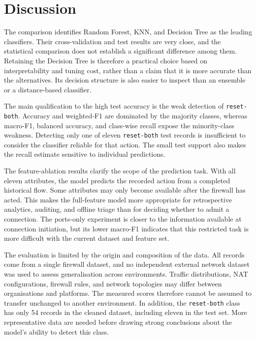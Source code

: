 \section{Discussion}\label{sec:results-discussion}

The comparison identifies Random Forest, KNN, and Decision Tree as the leading classifiers. Their cross-validation and test results are very close, and the statistical comparison does not establish a significant difference among them. Retaining the Decision Tree is therefore a practical choice based on interpretability and tuning cost, rather than a claim that it is more accurate than the alternatives. Its decision structure is also easier to inspect than an ensemble or a distance-based classifier.

The main qualification to the high test accuracy is the weak detection of \texttt{reset-both}. Accuracy and weighted-F1 are dominated by the majority classes, whereas macro-F1, balanced accuracy, and class-wise recall expose the minority-class weakness. Detecting only one of eleven \texttt{reset-both} test records is insufficient to consider the classifier reliable for that action. The small test support also makes the recall estimate sensitive to individual predictions.

The feature-ablation results clarify the scope of the prediction task. With all eleven attributes, the model predicts the recorded action from a completed historical flow. Some attributes may only become available after the firewall has acted. This makes the full-feature model more appropriate for retrospective analytics, auditing, and offline triage than for deciding whether to admit a connection. The ports-only experiment is closer to the information available at connection initiation, but its lower macro-F1 indicates that this restricted task is more difficult with the current dataset and feature set.

The evaluation is limited by the origin and composition of the data. All records come from a single firewall dataset, and no independent external network dataset was used to assess generalisation across environments. Traffic distributions, NAT configurations, firewall rules, and network topologies may differ between organisations and platforms. The measured scores therefore cannot be assumed to transfer unchanged to another environment. In addition, the \texttt{reset-both} class has only 54 records in the cleaned dataset, including eleven in the test set. More representative data are needed before drawing strong conclusions about the model's ability to detect this class.


